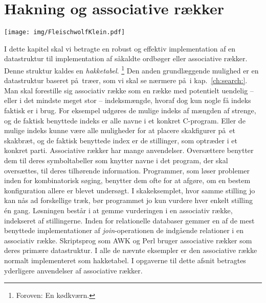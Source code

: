 \chapter{Hakning og associative rækker}

\renewcommand{\labelprefix}{ch:hash}
\llabel{}
\vspace*{-3.5cm}
\begin{flushright}
\texttt{[image: img/FleischwolfKlein.pdf]}
\end{flushright}

I dette kapitel skal vi betragte en robust og effektiv implementation af en datastruktur til implementation af såkaldte ordbøger eller associative rækker.
Denne struktur kaldes en \emph{hakketabel}.
\footnote{Foroven: En kødkværn.}
Den anden grundlæggende mulighed er en datastruktur baseret på træer, som vi skal se nærmere på i kap.~\ref{ch:search:}.
Man skal forestille sig associativ række som en række med potentielt uendelig -- eller i det mindste meget stor -- indeksmængde, hvoraf dog kun nogle få indeks faktisk er i brug.
For eksempel udgøres de mulige indeks af mængden af strenge, og de faktisk benyttede indeks er alle navne i et konkret C-program.
Eller de mulige indeks kunne være alle muligheder for at placere skakfigurer på et skakbræt,
og de faktisk benyttede index er de stillinger, som optræder i et konkret parti.
Associative rækker har mange anvendelser.
Oversættere
benytter dem til deres symboltabeller
som knytter navne i det program, der skal oversættes, til deres tilhørende information.
Programmer, som løser problemer inden for kombinatorisk søging,
benytter dem ofte for at afgøre, om en bestem konfiguration allere er blevet undersøgt.
I skakeksemplet, hvor samme stilling jo kan nås ad forskellige træk, bør programmet jo kun vurdere hver enkelt stilling én gang.
Løsningen består i at gemme vurderingen i en associativ række, indekseret af stillingerne.
Inden for relationelle databaser gemmer en af de mest benyttede implementationer af \emph{join}-operationen
 de indgående relationer i en associativ række.
Skriptsprog som 
AWK \cite{AWK88} og Perl \cite{WCO00} bruger associative rækker som deres primære datastruktur.
I alle de nævnte eksempler er den associative række normalt implementeret som hakketabel.
I opgaverne til dette afsnit betragtes yderligere anvendelser af associative rækker.

